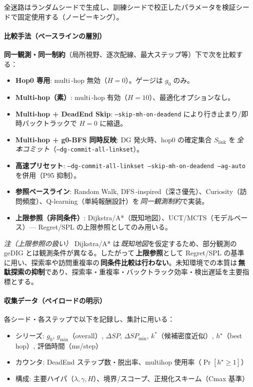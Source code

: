 \documentclass[ja=standard,xelatex]{bxjsarticle}
\begin{document}
全迷路はランダムシードで生成し、訓練シードで校正したパラメータを検証シードで固定使用する（ノーピーキング）。

\paragraph{比較手法（ベースラインの層別）}
\textbf{同一観測・同一制約}（局所視野、逐次配線、最大ステップ等）下で次を比較する：
\begin{itemize}
  \item \textbf{Hop0 専用}: multi\,\mbox{-}hop 無効（$H{=}0$）。ゲージは $g_0$ のみ。
  \item \textbf{Multi-hop（素）}: multi\,\mbox{-}hop 有効（$H{=}10$）、最適化オプションなし。
  \item \textbf{Multi-hop + DeadEnd Skip}: \texttt{--skip-mh-on-deadend} により行き止まり/即時バックトラックで $H{=}0$ に縮退。
  \item \textbf{Multi-hop + g0-BFS 同時反映}: DG 発火時、hop0 の確定集合 $S_{\mathrm{link}}$ を\,\emph{全本コミット}（\texttt{--dg-commit-all-linkset}）。
  \item \textbf{高速プリセット}: \texttt{--dg-commit-all-linkset --skip-mh-on-deadend --ag-auto} を併用（P95 抑制）。
  \item \textbf{参照ベースライン}: Random Walk, DFS\,\mbox{-}inspired（深さ優先）、Curiosity（訪問頻度）、Q-learning（単純報酬設計）を\,\emph{同一観測制約}で実装。
  \item \textbf{上限参照（非同条件）}: Dijkstra/A*（既知地図）、UCT/MCTS（モデルベース）— Regret/SPL の上限参照としてのみ用いる。
\end{itemize}

\noindent\textit{注（上限参照の扱い）}\; Dijkstra/A* は\,\emph{既知地図}を仮定するため、部分観測の geDIG とは観測条件が異なる。したがって\,\textbf{上限参照}として Regret/SPL の基準に用い、探索率や訪問重複率の\,\textbf{同条件比較は行わない}。未知環境での本質は\,\textbf{無駄探索の抑制}であり、探索率・重複率・バックトラック効率・検出遅延を主要指標とする。

\paragraph{収集データ（ペイロードの明示）}
各シード・各ステップで以下を記録し、集計に用いる：
\begin{itemize}
  \item シリーズ: $g_0$, $g_{\min}$（overall）, $\Delta SP$, $\Delta SP_{\min}$, $k^*$（候補密度近似）, $h^{\star}$（best hop）, 評価時間（ms/step）
  \item カウンタ: DeadEnd ステップ数・脱出率、multihop 使用率（$\Pr[h^{\star}\ge1]$）
  \item 構成: 主要ハイパ（$\lambda,\gamma,H$）、境界/スコープ、正規化スキーム（Cmax 基準）
\end{itemize}
\end{document}
